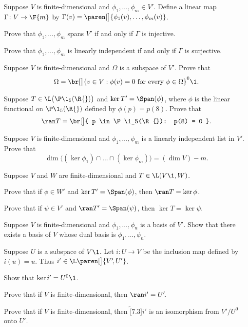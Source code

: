 \exercise
Suppose $V$ is finite-dimensional and $\phi_1, \dots, \phi_m \in V'\!$. Define a linear map $\Gamma \colon V \to \F{m}$ by
$
\Gamma(v) = \paren[\big]{ \phi_1(v), \dots, \phi_m(v) }$.
\begin{subtheorem}
\item
Prove that $\phi_1, \dots, \phi_m$ spans $V'$ if and only if $\Gamma$ is injective.
\item
Prove that $\phi_1, \dots, \phi_m$ is linearly independent if and only if $\Gamma$ is surjective.
\end{subtheorem}
\exercisesubtheoremend


\exercise
Suppose $V$ is finite-dimensional and $\Omega$ is a subspace of $V'\!$. Prove that
\[
\Omega = \br[\big]{v \in V: \phi(v) = 0 \text{\ for every } \phi \in \Omega}^0\1.
\]
\exercisedisplayend


 \exercise
Suppose $T \in \L\bigl( \P\1_5(\R{}) \bigr)$ and $\ker T' = \Span(\phi)$, where $\phi$ is the linear functional on $\P\1_5(\R{})$ defined by $\phi(p) = p(8)$. Prove that
\[
\ran T = \br[\big]{ p \in \P\1_5(\R{}): p(8) = 0 }.
\]
\exercisedisplayend


\exercise
Suppose $V$ is finite-dimensional and $\phi_1, \dots, \phi_m$ is a linearly independent list in $V'\!$. Prove that \label{intker}
\[
\dim \bigl( (\ker \phi_1) \cap \dots \cap (\ker \phi_m)\bigr) = (\dim V) - m.
\]
\exercisedisplayend


\exercise
Suppose $V$ and $W$ are finite-dimensional and $T \in \L(V\1, W)$.
\begin{subtheorem}
\item
Prove that if $\phi \in W'$ and $\ker T' = \Span(\phi)$, then $\ran T = \ker \phi$.
\item
Prove that if $\psi \in V'$ and $\ran T' = \Span(\psi)$, then $\ker T = \ker \psi$.
\end{subtheorem}
\exercisesubtheoremend


\exercise
Suppose $V$ is finite-dimensional and $\phi_1, \dots, \phi_n$ is a basis of $V'\!$. Show that there exists a basis of $V$ whose dual basis is $\phi_1, \dots, \phi_n$.


\exercise
Suppose $U$ is a subspace of $V\1$. Let $i \colon U \to V$ be the inclusion map defined by $i(u) = u$. Thus
$i' \in \L\paren[\big]{V'\!, U'}$.
\begin{subtheorem}
\item
Show that $\ker i' = U^0\1$.
\item
Prove that if $V$ is finite-dimensional, then $\ran i' = U'\!$.
\item
Prove that if $V$ is finite-dimensional, then $\tilde[7.3]{i'}$ is an isomorphism from $V'\!/U^0$ onto $U'\!$.
\end{subtheorem}


